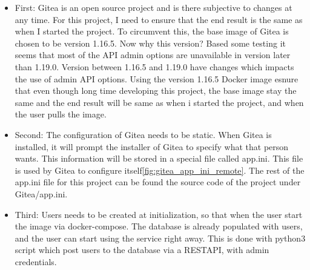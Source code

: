 \begin{itemize}
    \item First: Gitea is an open source project and is there subjective to changes at any time. For this project,
    I need to ensure that the end result is the same as when I started the project. 
    To circumvent this, the base image of Gitea is chosen to be version 1.16.5. Now why this version? 
    Based some testing it seems that most of the API admin options are unavailable in version later than 1.19.0. Version between 1.16.5 and 1.19.0
    have changes which impacts the use of admin API options.
    Using the version 1.16.5 Docker image esnure that even though long time developing this project, the base image stay the same and 
    the end result will be same as when i started the project, and when the user pulls the image.
    \item Second: The configuration of Gitea needs to be static. When Gitea is installed, it will prompt the installer of Gitea 
    to specify what that person wants. This information will be stored in a special file called app.ini. This file is 
    used by Gitea to configure itself\ref{fig:gitea_app_ini_remote}. The rest of the app.ini file for this project
    can be found the source code of the project under Gitea/app.ini.
    \item Third: Users needs to be created at initialization, so that when the user start the image via docker-compose. 
    The database is already populated with users, and the user can start using the service right away.
    This is done with python3\cite{python} script which 
    post users to the database via a \ac{RESTAPI}, with admin credentials.
\end{itemize}